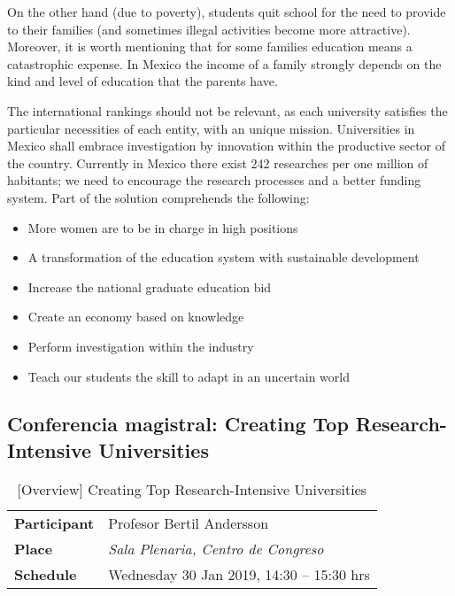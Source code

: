 \documentclass[11pt,a4paper]{article}
\begin{document}
On the other hand (due to poverty), students quit school for the need to provide to their families (and sometimes illegal activities become more attractive). Moreover, it is worth mentioning that for some families education means a catastrophic expense. In Mexico the income of a family strongly depends on the kind and level of education that the parents have.

The international rankings should not be relevant, as each university satisfies the particular necessities of each entity, with an unique mission. Universities in Mexico shall embrace investigation by innovation within the productive sector of the country. Currently in Mexico there exist 242 researches per one million of habitants; we need to encourage the research processes and a better funding system. Part of the solution comprehends the following:

\begin{itemize}
	\item{More women are to be in charge in high positions}
	\item{A transformation of the education system with sustainable development}
	\item{Increase the national graduate education bid}
	\item{Create an economy based on knowledge}
	\item{Perform investigation within the industry}
	\item{Teach our students the skill to adapt in an uncertain world}
\end{itemize}

\clearpage

\subsection{Conferencia magistral: Creating Top Research-Intensive Universities}\label{sec:conference2}

\parencite{Andersson2019}
\begin{table}[h] %
\centering
\begin{tabular}{|l|l|}
\hline
\textbf{Participant} & Profesor Bertil Andersson \\
\textbf{Place}       & \emph{Sala Plenaria, Centro de Congreso} \\
\textbf{Schedule}    & Wednesday 30 Jan 2019, 14:30 – 15:30 hrs \\
\hline
\end{tabular}
\caption{[Overview] Creating Top Research-Intensive Universities}\label{tab:table}
\end{table}
\end{document}
